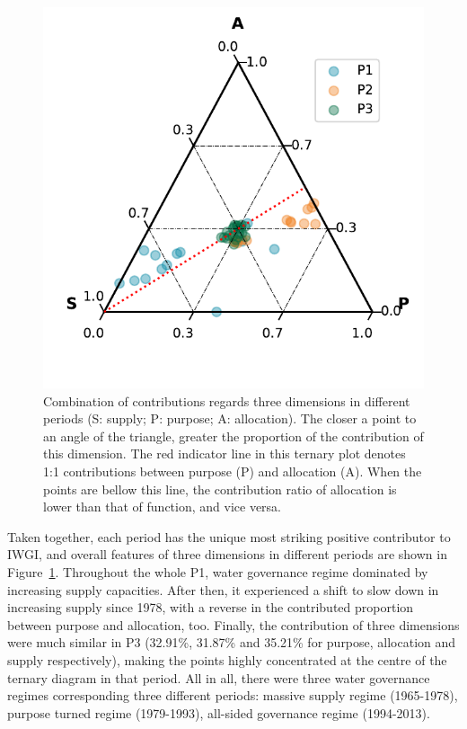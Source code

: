 \documentclass[9pt, twocolumn, twoside, lineno]{pnas-new}
\begin{document}
\begin{figure}[!htbp]
	\centering
	\includegraphics[width=0.9\linewidth]{../../figures/main/phases.pdf}
	\caption{Combination of contributions regards three dimensions in different periods (S: supply; P: purpose; A: allocation). The closer a point to an angle of the triangle, greater the proportion of the contribution of this dimension.
	The red indicator line in this ternary plot denotes 1:1 contributions between purpose (P) and allocation (A). When the points are bellow this line, the contribution ratio of allocation is lower than that of function, and vice versa.}
	\label{fig:phases}
\end{figure}

Taken together, each period has the unique most striking positive contributor to IWGI, and overall features of three dimensions in different periods are shown in Figure~\ref{fig:phases}.
Throughout the whole P1, water governance regime dominated by increasing supply capacities. After then, it experienced a shift to slow down in increasing supply since 1978, with a reverse in the contributed proportion between purpose and allocation, too.
Finally, the contribution of three dimensions were much similar in P3 (32.91\%, 31.87\% and 35.21\% for purpose, allocation and supply respectively), making the points highly concentrated at the centre of the ternary diagram in that period.
All in all, there were three water governance regimes corresponding three different periods: massive supply regime (1965-1978), purpose turned regime (1979-1993), all-sided governance regime (1994-2013). 
\end{document}
